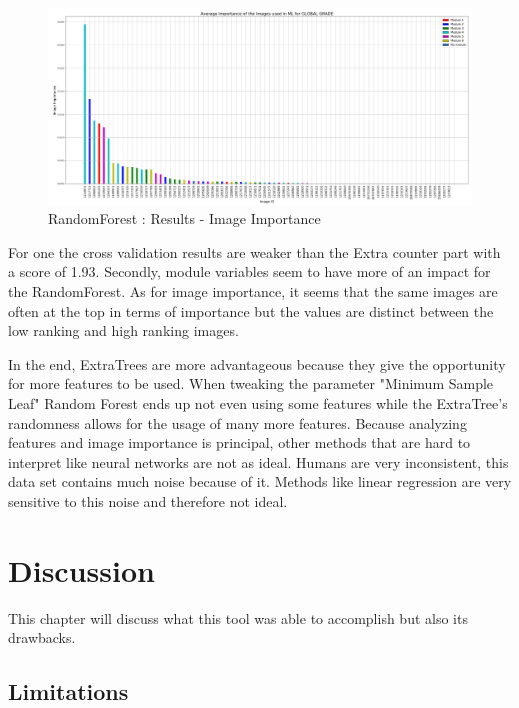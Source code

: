 \documentclass[a4paper,11pt]{report}
\numberwithin{figure}{chapter} %
\begin{document}
      \begin{figure}[H]
      \centering
      \includegraphics[width=.99\linewidth]{plots/im_importance_GLOBAL_GRADE_2018-05-29_11_04_29.png}
      \caption{RandomForest : Results - Image Importance}
      \label{fig:test3_3}
      \end{figure}

    For one the cross validation results are weaker than the Extra counter part with a score of 1.93.
    Secondly, module variables seem to have more of an impact for the RandomForest.
    As for image importance, it seems that the same images are often at the top in terms of importance but the values are distinct between the low ranking and high ranking images.


    In the end, ExtraTrees are more advantageous because they give the opportunity for more features to be used.
    When tweaking the parameter "Minimum Sample Leaf" Random Forest ends up not even using some features while the ExtraTree's randomness allows for the usage of many more features.
    Because analyzing features and image importance is principal, other methods that are hard to interpret like neural networks are not as ideal.
    Humans are very inconsistent, this data set contains much noise because of it.
    Methods like linear regression are very sensitive to this noise and therefore not ideal.



\chapter{Discussion} \label{Discussion}

    This chapter will discuss what this tool was able to accomplish but also its drawbacks.

    \section{Limitations}
\end{document}
